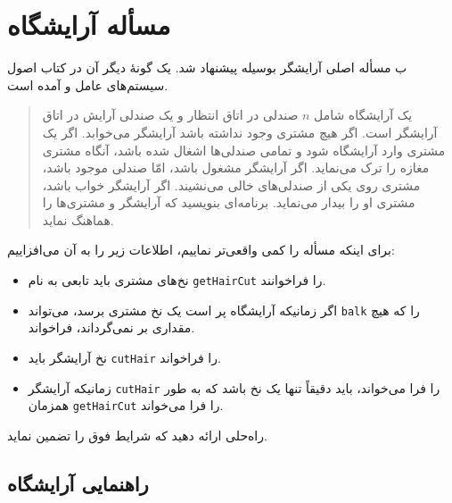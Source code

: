 \documentclass{book}
\newcommand{\clearemptydoublepage}{}%
\begin{document}
\clearemptydoublepage
\section{مسأله آرایشگاه}

ب    مسأله اصلی آرایشگر بوسیله  پیشنهاد شد. 
    یک گونهٔ دیگر آن در کتاب اصول سیستم‌های عامل  و 
    آمده است\cite{silberschatz}. 

\begin {quotation}
    یک آرایشگاه شامل $n$ صندلی در اتاق انتظار و یک صندلی آرایش در اتاق آرایشگر است. 
    اگر هیچ مشتری وجود نداشته باشد آرایشگر می‌خوابد. 
    اگر یک مشتری وارد آرایشگاه شود و تمامی صندلی‌ها اشغال شده باشد، آنگاه مشتری مغازه را ترک می‌نماید. 
    اگر آرایشگر مشغول باشد، امّا صندلی موجود باشد، مشتری روی یکی از صندلی‌های خالی می‌نشیند. 
    اگر آرایشگر خواب باشد، مشتری او را بیدار می‌نماید. 
    برنامه‌ای بنویسید که آرایشگر و مشتری‌ها را هماهنگ نماید. 
\end{quotation}

    برای اینکه مسأله را کمی واقعی‌تر نماییم، اطلاعات زیر را به آن می‌افزاییم: 

\begin{itemize}

\item
    نخ‌های مشتری باید تابعی به نام {\tt getHairCut} را فراخوانند. 

\item 
    اگر زمانیکه آرایشگاه پر است یک نخ مشتری برسد، می‌تواند {\tt balk} را که هیچ مقداری بر نمی‌گرداند،  فراخواند. 

\item 
    نخ آرایشگر باید {\tt cutHair} را فراخواند. 

\item 
    زمانیکه آرایشگر {\tt cutHair} را فرا می‌خواند،‌ 
    باید دقیقاً تنها یک نخ باشد که به طور همزمان  {\tt getHairCut} را فرا می‌خواند. 

\end{itemize}

    راه‌حلی ارائه دهید  که شرایط فوق را تضمین نماید. 


\clearemptydoublepage
\subsection{راهنمایی آرایشگاه}

\begin{latin}

\end{latin}
\end{document}
